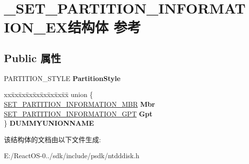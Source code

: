 \hypertarget{struct___s_e_t___p_a_r_t_i_t_i_o_n___i_n_f_o_r_m_a_t_i_o_n___e_x}{}\section{\+\_\+\+S\+E\+T\+\_\+\+P\+A\+R\+T\+I\+T\+I\+O\+N\+\_\+\+I\+N\+F\+O\+R\+M\+A\+T\+I\+O\+N\+\_\+\+E\+X结构体 参考}
\label{struct___s_e_t___p_a_r_t_i_t_i_o_n___i_n_f_o_r_m_a_t_i_o_n___e_x}
\subsection*{Public 属性}
\begin{DoxyCompactItemize}
\item 
\mbox{\label{struct___s_e_t___p_a_r_t_i_t_i_o_n___i_n_f_o_r_m_a_t_i_o_n___e_x_add6e4440e20420d4206035a22ecb51b6}} 
P\+A\+R\+T\+I\+T\+I\+O\+N\+\_\+\+S\+T\+Y\+LE {\bfseries Partition\+Style}
\item 
\mbox{\label{struct___s_e_t___p_a_r_t_i_t_i_o_n___i_n_f_o_r_m_a_t_i_o_n___e_x_a10aaac67b0411cb9dc95ed4163b90f85}} 
\begin{tabbing}
xx\=xx\=xx\=xx\=xx\=xx\=xx\=xx\=xx\=\kill
union \{\\
\>\hyperlink{struct___s_e_t___p_a_r_t_i_t_i_o_n___i_n_f_o_r_m_a_t_i_o_n}{SET\_PARTITION\_INFORMATION\_MBR} {\bfseries Mbr}\\
\>\hyperlink{struct___p_a_r_t_i_t_i_o_n___i_n_f_o_r_m_a_t_i_o_n___g_p_t}{SET\_PARTITION\_INFORMATION\_GPT} {\bfseries Gpt}\\
\} {\bfseries DUMMYUNIONNAME}\\

\end{tabbing}\end{DoxyCompactItemize}


该结构体的文档由以下文件生成\+:\begin{DoxyCompactItemize}
\item 
E\+:/\+React\+O\+S-\/0../sdk/include/psdk/ntdddisk.\+h\end{DoxyCompactItemize}
